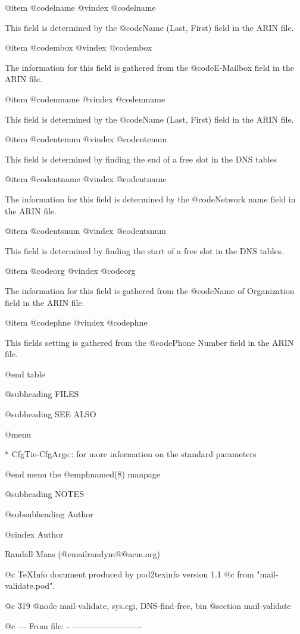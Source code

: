 @item @code{lname}
@vindex @code{lname}

This field is determined by the @code{Name (Last, First)} field in the ARIN file.

@item @code{mbox}
@vindex @code{mbox}

The information for this field is gathered from the @code{E-Mailbox} field in the
ARIN file.

@item @code{mname}
@vindex @code{mname}

This field is determined by the @code{Name (Last, First)} field in the ARIN file.

@item @code{ntenum}
@vindex @code{ntenum}

This field is determined by finding the end of a free slot in the DNS tables

@item @code{ntname}
@vindex @code{ntname}

The information for this field is determined by the @code{Network name} field in
the ARIN file.

@item @code{ntsnum}
@vindex @code{ntsnum}

This field is determined by finding the start of a free slot in the DNS tables.

@item @code{org}
@vindex @code{org}

The information for this field is gathered from the @code{Name of Organization}
field in the ARIN file.

@item @code{phne}
@vindex @code{phne}

This fields setting is gathered from the @code{Phone Number} field in the ARIN
file.

@end table

@subheading FILES

@subheading SEE ALSO


@menu

* CfgTie-CfgArgs::	
 for more information on the standard parameters

@end menu
the @emph{named}(8) manpage

@subheading NOTES

@subsubheading Author

@cindex Author

Randall Maas (@email{randym@@acm.org})

@c TeXInfo document produced by pod2texinfo version 1.1
@c from "mail-validate.pod".


@c 319
@node mail-validate, sys.cgi, DNS-find-free, bin
@section mail-validate


@c --- From file: - -------------------------

